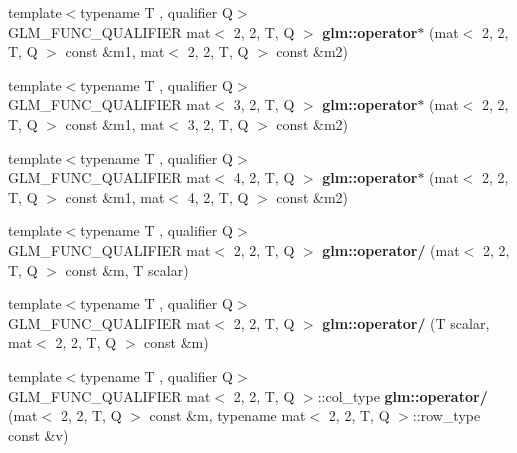 \begin{DoxyCompactItemize}
\item 
\mbox{\label{type__mat2x2_8inl_a9d351b42dc8b85017ba0859097a7c7cb}} 
{\footnotesize template$<$typename T , qualifier Q$>$ }\\G\+L\+M\+\_\+\+F\+U\+N\+C\+\_\+\+Q\+U\+A\+L\+I\+F\+I\+ER mat$<$ 2, 2, T, Q $>$ {\bfseries glm\+::operator$\ast$} (mat$<$ 2, 2, T, Q $>$ const \&m1, mat$<$ 2, 2, T, Q $>$ const \&m2)
\item 
\mbox{\label{type__mat2x2_8inl_a32a3f3f150547afbd5920c527a0646cf}} 
{\footnotesize template$<$typename T , qualifier Q$>$ }\\G\+L\+M\+\_\+\+F\+U\+N\+C\+\_\+\+Q\+U\+A\+L\+I\+F\+I\+ER mat$<$ 3, 2, T, Q $>$ {\bfseries glm\+::operator$\ast$} (mat$<$ 2, 2, T, Q $>$ const \&m1, mat$<$ 3, 2, T, Q $>$ const \&m2)
\item 
\mbox{\label{type__mat2x2_8inl_a40f4b250002244ef41c9b4b30090eeb0}} 
{\footnotesize template$<$typename T , qualifier Q$>$ }\\G\+L\+M\+\_\+\+F\+U\+N\+C\+\_\+\+Q\+U\+A\+L\+I\+F\+I\+ER mat$<$ 4, 2, T, Q $>$ {\bfseries glm\+::operator$\ast$} (mat$<$ 2, 2, T, Q $>$ const \&m1, mat$<$ 4, 2, T, Q $>$ const \&m2)
\item 
\mbox{\label{type__mat2x2_8inl_a604ec21846ec7d5a3335c4858f91b1e8}} 
{\footnotesize template$<$typename T , qualifier Q$>$ }\\G\+L\+M\+\_\+\+F\+U\+N\+C\+\_\+\+Q\+U\+A\+L\+I\+F\+I\+ER mat$<$ 2, 2, T, Q $>$ {\bfseries glm\+::operator/} (mat$<$ 2, 2, T, Q $>$ const \&m, T scalar)
\item 
\mbox{\label{type__mat2x2_8inl_af94f7fcc9299aa7f2cbbcac8b4b251f5}} 
{\footnotesize template$<$typename T , qualifier Q$>$ }\\G\+L\+M\+\_\+\+F\+U\+N\+C\+\_\+\+Q\+U\+A\+L\+I\+F\+I\+ER mat$<$ 2, 2, T, Q $>$ {\bfseries glm\+::operator/} (T scalar, mat$<$ 2, 2, T, Q $>$ const \&m)
\item 
\mbox{\label{type__mat2x2_8inl_a1371d2a3e665b5d05d78e7508cac0666}} 
{\footnotesize template$<$typename T , qualifier Q$>$ }\\G\+L\+M\+\_\+\+F\+U\+N\+C\+\_\+\+Q\+U\+A\+L\+I\+F\+I\+ER mat$<$ 2, 2, T, Q $>$\+::col\+\_\+type {\bfseries glm\+::operator/} (mat$<$ 2, 2, T, Q $>$ const \&m, typename mat$<$ 2, 2, T, Q $>$\+::row\+\_\+type const \&v)

\end{DoxyCompactItemize}
